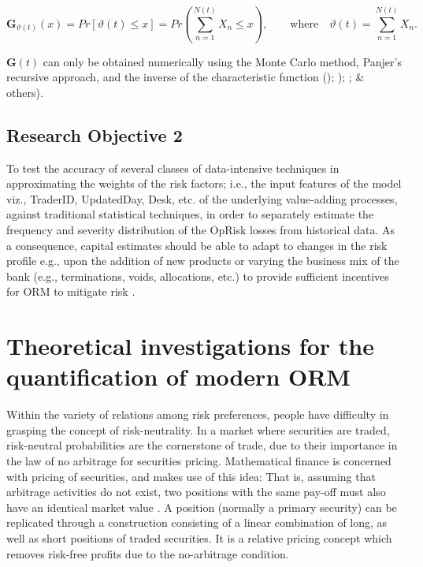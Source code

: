 \documentclass[a4paper]{article}
\begin{document}
\begin{equation}\label{eqn4}
\mathbf{G}_{\vartheta(t)}(x)=Pr[\vartheta(t)\leq x]=Pr\left(\sum_{n=1}^{N(t)}X_{n} \leq x\right), \qquad \mbox{where} \quad \vartheta(t) = \sum_{n=1}^{N(t)} X_{n}.
\end{equation} 

\begin{math} \mathbf{G}(t)\end{math} can only be obtained numerically using the Monte Carlo method, Panjer's recursive approach, and the inverse of the characteristic function (\cite{frachot2001loss}); \cite{aue2006lda}); \cite{panjer2006operational}; \& others).

\subsection{Research Objective 2}

To test the accuracy of several classes of data-intensive techniques in approximating the weights of the risk factors; i.e., the input features of the model viz., TraderID, UpdatedDay, Desk, etc.  of the underlying value-adding processes, against traditional statistical techniques, in order to separately estimate the frequency and severity distribution of the OpRisk losses from historical data. As a consequence, capital estimates should be able to adapt to changes in the risk profile e.g., upon the addition of new products or varying the business mix of the bank (e.g., terminations, voids,  allocations, etc.) to provide sufficient incentives for ORM to mitigate risk \citep{einemann2018operational}.

\section{Theoretical investigations for the quantification of modern ORM}

Within the variety of relations among risk preferences, people have difficulty in grasping the concept of risk-neutrality. In a market where securities are traded, risk-neutral probabilities are the cornerstone of trade, due to their importance in the law of no arbitrage for securities pricing. Mathematical finance is concerned with pricing of securities, and makes use of this idea: That is, assuming that arbitrage activities do not exist, two positions with the same pay-off must also have an identical market value \citep{gisiger2010risk}. A position (normally a primary security) can be replicated through a construction consisting of a linear combination of long, as well as short positions of traded securities. It is a relative pricing concept which removes risk-free profits due to the no-arbitrage condition.\medskip
\end{document}
